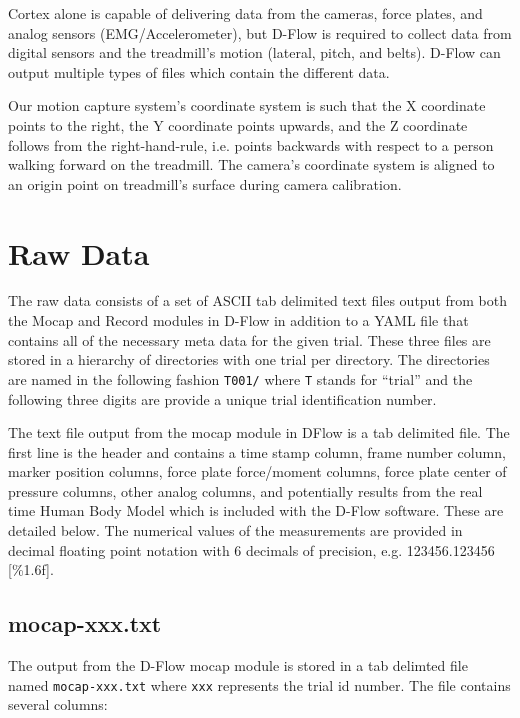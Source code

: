 \documentclass{article}
\begin{document}
Cortex alone is capable of delivering data from the cameras, force plates, and
analog sensors (EMG/Accelerometer), but D-Flow is required to collect data from
digital sensors and the treadmill’s motion (lateral, pitch, and belts). D-Flow
can output multiple types of files which contain the different data.

Our motion capture system’s coordinate system is such that the X coordinate
points to the right, the Y coordinate points upwards, and the Z coordinate
follows from the right-hand-rule, i.e. points backwards with respect to a
person walking forward on the treadmill. The camera’s coordinate system is
aligned to an origin point on treadmill’s surface during camera calibration.

\section{Raw Data}
%
The raw data consists of a set of ASCII tab delimited text files output from
both the Mocap and Record modules in D-Flow in addition to a YAML file that
contains all of the necessary meta data for the given trial. These three files
are stored in a hierarchy of directories with one trial per directory. The
directories are named in the following fashion \verb+T001/+ where \verb+T+
stands for ``trial'' and the following three digits are provide a unique trial
identification number.

The text file output from the mocap module in DFlow is a tab delimited file.
The first line is the header and contains a time stamp column, frame number
column, marker position columns, force plate force/moment columns, force plate
center of pressure columns, other analog columns, and potentially results from
the real time Human Body Model \cite{Bogert2013} which is included with the
D-Flow software. These are detailed below. The numerical values of the
measurements are provided in decimal floating point notation with 6 decimals of
precision, e.g. 123456.123456 [\%1.6f].

\subsection{mocap-xxx.txt}

The output from the D-Flow mocap module is stored in a tab delimted file named
\verb+mocap-xxx.txt+ where \verb+xxx+ represents the trial id number. The file
contains several columns:
\end{document}

